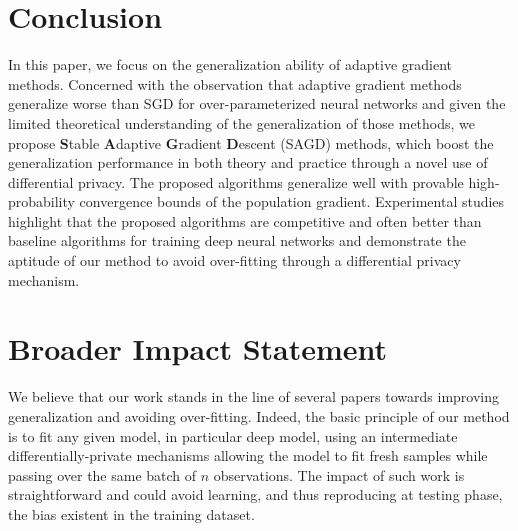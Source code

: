 \documentclass[11pt]{article}
\begin{document}
\section{Conclusion}\label{sec: conclusion}
\vspace{-0.05in}

In this paper, we focus on the generalization ability of adaptive gradient methods. 
Concerned with the observation that adaptive gradient methods generalize worse than SGD for over-parameterized neural networks and given the limited theoretical understanding of the generalization of those methods,
we propose \textbf{S}table \textbf{A}daptive \textbf{G}radient \textbf{D}escent (\textsc{SAGD}) methods, which boost the generalization performance in both theory and practice through a novel use of differential privacy. 
The proposed algorithms generalize well with provable high-probability convergence bounds of the population gradient. 
Experimental studies highlight that the proposed algorithms are competitive and often better than baseline algorithms for training deep neural networks and demonstrate the aptitude of our method to avoid over-fitting through a differential privacy mechanism.


\clearpage
\section{Broader Impact Statement}
We believe that our work stands in the line of several papers towards improving generalization and avoiding over-fitting.
Indeed, the basic principle of our method is to fit any given model, in particular deep model, using an intermediate differentially-private mechanisms allowing the model to fit fresh samples while passing over the same batch of $n$ observations.
The impact of such work is straightforward and could avoid learning, and thus reproducing at testing phase, the bias existent in the training dataset.






\clearpage


\appendix


\end{document}
